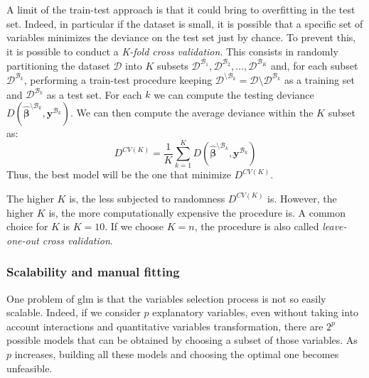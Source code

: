 \documentclass[a4paper, twoside, openright, 12pt]{report}
\theoremstyle{definition}
\theoremstyle{definition}
\theoremstyle{definition}
\theoremstyle{remark}
\begin{document}
A limit of the train-test approach is that it could bring to overfitting in the test set. Indeed, in particular if the dataset is small, it is possible that a specific set of variables minimizes the deviance on the test set just by chance. To prevent this, it is possible to conduct a \emph{K-fold cross validation}. This consists in randomly partitioning the dataset \(\mathcal{D}\) into \(K\) subsets \(\mathcal{D}^{\mathcal{B}_1}, \mathcal{D}^{\mathcal{B}_2}, \dots, \mathcal{D}^{\mathcal{B}_K}\) and, for each subset \(\mathcal{D}^{\mathcal{B}_k}\), performing a train-test procedure keeping \(\mathcal{D}^{\setminus \mathcal{B}_k} = \mathcal{D} \setminus \mathcal{D}^{\mathcal{B}_k}\) as a training set and \(\mathcal{D}^{\mathcal{B}_k}\) as a test set. For each \(k\) we can compute the testing deviance \(D\left( \hat{\boldsymbol{\beta}}^{\setminus \mathcal{B}_k}, \boldsymbol{y}^{\mathcal{B}_k} \right)\). We can then compute the average deviance within the \(K\) subset as:
\[
D^{CV(K)} = \frac{1}{K} \sum_{k=1}^{K}{D\left( \hat{\boldsymbol{\beta}}^{\setminus \mathcal{B}_k}, \boldsymbol{y}^{\mathcal{B}_k} \right)}
\]
Thus, the best model will be the one that minimize \(D^{CV(K)}\).

The higher \(K\) is, the less subjected to randomness \(D^{CV(K)}\) is. However, the higher \(K\) is, the more computationally expensive the procedure is. A common choice for \(K\) is \(K=10\). If we choose \(K=n\), the procedure is also called \emph{leave-one-out cross validation}.

\hypertarget{scalability-and-manual-fitting}{%
\subsubsection{Scalability and manual fitting}\label{scalability-and-manual-fitting}}

One problem of \ac{glm} is that the variables selection process is not so easily scalable. Indeed, if we consider \(p\) explanatory variables, even without taking into account interactions and quantitative variables transformation, there are \(2^p\) possible models that can be obtained by choosing a subset of those variables. As \(p\) increases, building all these models and choosing the optimal one becomes unfeasible.
\end{document}
